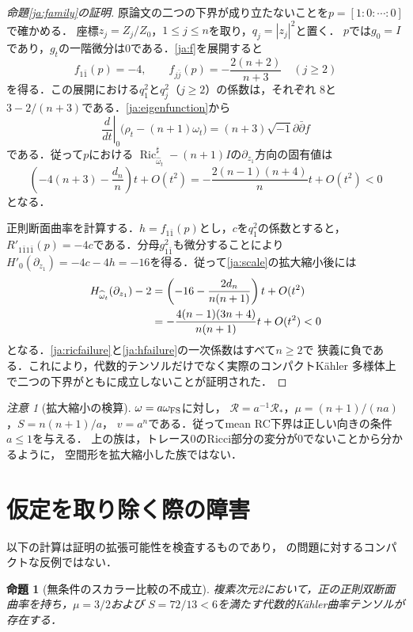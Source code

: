 \documentclass[12pt]{amsart}
\theoremstyle{definition}
\theoremstyle{remark}
\numberwithin{equation}{section}
\DeclareMathOperator{\Ric}{Ric}
\theoremstyle{plain}
\newtheorem{jprop}[thm]{命題}
\theoremstyle{remark}
\newtheorem{jrem}[thm]{注意}
\theoremstyle{definition}
\begin{document}
\begin{proof}[命題\ref{ja:family}の証明]
原論文の二つの下界が成り立たないことを$p=[1:0:\cdots:0]$で確かめる．
座標$z_j=Z_j/Z_0$，$1\leq j\leq n$を取り，$q_j=|z_j|^2$と置く．
$p$では$g_0=I$であり，$g_t$の一階微分は0である．\eqref{ja:f}を展開すると
\[
 f_{1\bar1}(p)=-4,\qquad
 f_{j\bar j}(p)=-\frac{2(n+2)}{n+3}\quad (j\geq2)
\]
を得る．この展開における$q_1^2$と$q_j^2$（$j\geq2$）の係数は，それぞれ
$8$と$3-2/(n+3)$である．\eqref{ja:eigenfunction}から
\[
 \left.\frac d{dt}\right|_0
       \bigl(\rho_t-(n+1)\omega_t\bigr)
 =(n+3)\sqrt{-1}\partial\bar\partial f
\]
である．従って$p$における
$\Ric^\sharp_{\widehat\omega_t}-(n+1)I$の$\partial_{z_1}$方向の固有値は
\begin{equation}\label{ja:ricfailure}
 \left(-4(n+3)-\frac{d_n}{n}\right)t+O(t^2)
 =-\frac{2(n-1)(n+4)}n t+O(t^2)<0
\end{equation}
となる．

正則断面曲率を計算する．$h=f_{1\bar1}(p)$とし，$c$を$q_1^2$の係数とすると，
$R'_{1\bar1 1\bar1}(p)=-4c$である．分母$g_{1\bar1}^2$も微分することにより
$H'_0(\partial_{z_1})=-4c-4h=-16$を得る．従って\eqref{ja:scale}の拡大縮小後には
\begin{align}\label{ja:hfailure}
 H_{\widehat\omega_t}(\partial_{z_1})-2
 &=\left(-16-\frac{2d_n}{n(n+1)}\right)t+O(t^2)\notag\\
 &=-\frac{4(n-1)(3n+4)}{n(n+1)}t+O(t^2)<0
\end{align}
となる．\eqref{ja:ricfailure}と\eqref{ja:hfailure}の一次係数はすべて$n\geq2$で
狭義に負である．これにより，代数的テンソルだけでなく実際のコンパクトK\"ahler
多様体上で二つの下界がともに成立しないことが証明された．
\end{proof}

\begin{jrem}[拡大縮小の検算]
$\omega=a\omega_{\rm FS}$に対し，
$\mathscr R=a^{-1}\mathscr R_*$，$\mu=(n+1)/(na)$，$S=n(n+1)/a$，
$v=a^n$である．従ってmean RC下界は正しい向きの条件$a\leq1$を与える．
上の族は，トレース0のRicci部分の変分が0でないことから分かるように，
空間形を拡大縮小した族ではない．
\end{jrem}

\section{仮定を取り除く際の障害}\label{ja:obstructions}

以下の計算は証明の拡張可能性を検査するものであり，
\cite[Section 6]{ja:DS}の問題に対するコンパクトな反例ではない．

\begin{jprop}[無条件のスカラー比較の不成立]\label{ja:counter}
複素次元2において，正の正則双断面曲率を持ち，$\mu=3/2$および
$S=72/13<6$を満たす代数的K\"ahler曲率テンソルが存在する．
\end{jprop}
\end{document}
